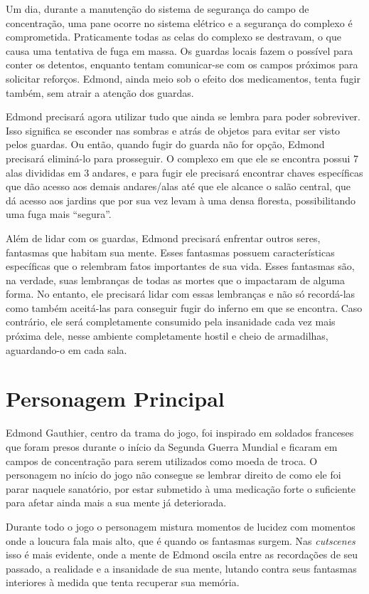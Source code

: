 \documentclass{article}
\begin{document}
    Um dia, durante a manutenção do sistema de segurança do campo de concentração, uma pane ocorre no sistema elétrico e a segurança do complexo é comprometida. Praticamente todas as celas do complexo se destravam, o que causa uma tentativa de fuga em massa. Os guardas locais fazem o possível para conter os detentos, enquanto tentam comunicar-se com os campos próximos para solicitar reforços. Edmond, ainda meio sob o efeito dos medicamentos, tenta fugir também, sem atrair a atenção dos guardas. 
    
    Edmond precisará agora utilizar tudo que ainda se lembra para poder sobreviver. Isso significa se esconder nas sombras e atrás de objetos para evitar ser visto pelos guardas. Ou então, quando fugir do guarda não for opção, Edmond precisará eliminá-lo para prosseguir. O complexo em que ele se encontra possui 7 alas divididas em 3 andares, e para fugir ele precisará encontrar chaves específicas que dão acesso aos demais andares/alas até que ele alcance o salão central, que dá acesso aos jardins que por sua vez levam à uma densa floresta, possibilitando uma fuga mais “segura”.
    
    Além de lidar com os guardas, Edmond precisará enfrentar outros seres, fantasmas que habitam sua mente. Esses fantasmas possuem características específicas que o relembram fatos importantes de sua vida. Esses fantasmas são, na verdade, suas lembranças de todas as mortes que o impactaram de alguma forma. No entanto, ele precisará lidar com essas lembranças e não só recordá-las como também aceitá-las para conseguir fugir do inferno em que se encontra. Caso contrário, ele será completamente consumido pela insanidade cada vez mais próxima dele, nesse ambiente completamente hostil e cheio de armadilhas, aguardando-o em cada sala. 

\section{Personagem Principal}
Edmond Gauthier, centro da trama do jogo, foi inspirado em soldados franceses que foram presos durante o início da Segunda Guerra Mundial e ficaram em campos de concentração para serem utilizados como moeda de troca. O personagem no início do jogo não consegue se lembrar direito de como ele foi parar naquele sanatório, por estar submetido à uma medicação forte o suficiente para afetar ainda mais a sua mente já deteriorada.

Durante todo o jogo o personagem mistura momentos de lucidez com momentos onde a loucura fala mais alto, que é quando os fantasmas surgem. Nas \textit{cutscenes} isso é mais evidente, onde a mente de Edmond oscila entre as recordações de seu passado, a realidade e a insanidade de sua mente, lutando contra seus fantasmas interiores à medida que tenta recuperar sua memória.
\end{document}

